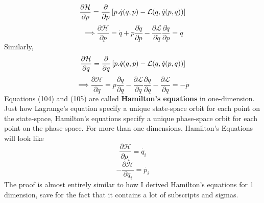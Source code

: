 \documentclass[12pt]{article}
\begin{document}
    \begin{equation}
        \frac{\partial\mathcal{H}}{\partial p}=\frac{\partial}{\partial{p}}\left[p.\dot{q}(q,p)-\mathcal{L}(q,\dot{q}(p,q))\right] \notag
    \end{equation}
    \begin{equation}
        \implies \frac{\partial \mathcal{H}}{\partial p}=\dot{q}+p\frac{\partial \dot{q}}{\partial p}-\frac{\partial \mathcal{L}}{\partial \dot{q}}\frac{\partial \dot{q}}{\partial p}=\dot{q}
    \end{equation}
    Similarly,
    \begin{equation}
        \frac{\partial\mathcal{H}}{\partial q}=\frac{\partial}{\partial{q}}\left[p.\dot{q}(q,p)-\mathcal{L}(q,\dot{q}(p,q))\right]\notag
    \end{equation}
    \begin{equation}
        \implies \frac{\partial \mathcal{H}}{\partial q}=p\frac{\partial \dot{q}}{\partial q}-\frac{\partial \mathcal{L}}{\partial \dot{q}}\frac{\partial \dot{q}}{\partial q}-\frac{\partial \mathcal{L}}{\partial q}=-\dot{p}
    \end{equation}
    Equations (104) and (105) are called \textbf{Hamilton's equations} in one-dimension. \\
    Just how Lagrange's equation specify a unique state-space orbit for each point on the state-space, Hamilton's equations specify a unique phase-space orbit for each point on the phase-space.
    For more than one dimensions, Hamilton's Equations will look like
    \begin{equation}
        \frac{\partial \mathcal{H}}{\partial p_i}=\dot{q_i}
    \end{equation}
    \begin{equation}
        -\frac{\partial \mathcal{H}}{\partial q_i}=\dot{p_i}
    \end{equation}
    The proof is almost entirely similar to how I derived Hamilton's equations for 1 dimension, save for the fact that it contains a lot of subscripts and sigmas.
\end{document}
